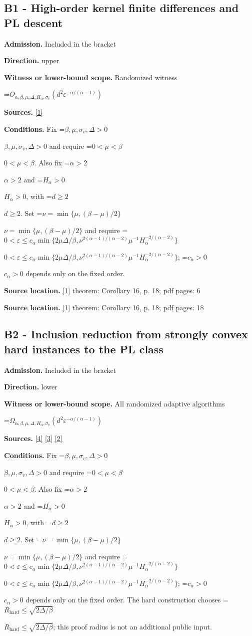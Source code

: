 \documentclass[10pt,a4paper]{article}
\newcommand{\AtlasMath}[1]{\par\begingroup\centering\setbox0=\hbox{$\displaystyle #1$}\ifdim\wd0>1.4\linewidth\typeout{ATLAS WIDE FORMULA: \the\wd0}\fi\ifdim\wd0>\linewidth\resizebox{\linewidth}{!}{\box0}\else\box0\fi\par\endgroup}
\newcommand{\AtlasInlineMath}[1]{\begingroup\setbox0=\hbox{$#1$}\ifdim\wd0>.4\linewidth\endgroup\AtlasMath{#1}\else\endgroup$#1$\fi}
\begin{document}
\subsection{B1 - High-order kernel finite differences and PL descent}
\textbf{Admission.} Included in the bracket

\textbf{Direction.} upper

\textbf{Witness or lower-bound scope.} Randomized witness

\AtlasMath{O_{\alpha,\beta,\mu,\Delta,H_\alpha,\sigma_v}(d^2\varepsilon^{-\alpha/(\alpha-1)})}
\textbf{Sources.} \href{https://jmlr.org/papers/volume25/23-0733/23-0733.pdf}{[1]}

\textbf{Conditions.} Fix \AtlasInlineMath{\beta,\mu,\sigma_v,\Delta>0} and require \AtlasInlineMath{0<\mu<\beta}. Also fix \AtlasInlineMath{\alpha>2} and \AtlasInlineMath{H_\alpha>0}, with \AtlasInlineMath{d\ge2}. Set \AtlasInlineMath{\nu=\min\{\mu,(\beta-\mu)/2\}} and require \AtlasInlineMath{0<\varepsilon\le c_\alpha\min\{2\mu\Delta/\beta,\nu^{2(\alpha-1)/(\alpha-2)}\mu^{-1}H_\alpha^{-2/(\alpha-2)}\}}; \AtlasInlineMath{c_\alpha>0} depends only on the fixed order.

\textbf{Source location.} \href{https://jmlr.org/papers/volume25/23-0733/23-0733.pdf}{[1]} theorem: Corollary 16, p. 18; pdf pages: 6

\textbf{Source location.} \href{https://jmlr.org/papers/volume25/23-0733/23-0733.pdf}{[1]} theorem: Corollary 16, p. 18; pdf pages: 18

\subsection{B2 - Inclusion reduction from strongly convex hard instances to the PL class}
\textbf{Admission.} Included in the bracket

\textbf{Direction.} lower

\textbf{Witness or lower-bound scope.} All randomized adaptive algorithms

\AtlasMath{\Omega_{\alpha,\beta,\mu,\Delta,H_\alpha,\sigma_v}(d^2\varepsilon^{-\alpha/(\alpha-1)})}
\textbf{Sources.} \href{https://proceedings.mlr.press/v30/Shamir13.html}{[4]} \href{https://arxiv.org/pdf/2610.05517v2}{[3]} \href{https://arxiv.org/html/2610.00276v2}{[2]}

\textbf{Conditions.} Fix \AtlasInlineMath{\beta,\mu,\sigma_v,\Delta>0} and require \AtlasInlineMath{0<\mu<\beta}. Also fix \AtlasInlineMath{\alpha>2} and \AtlasInlineMath{H_\alpha>0}, with \AtlasInlineMath{d\ge2}. Set \AtlasInlineMath{\nu=\min\{\mu,(\beta-\mu)/2\}} and require \AtlasInlineMath{0<\varepsilon\le c_\alpha\min\{2\mu\Delta/\beta,\nu^{2(\alpha-1)/(\alpha-2)}\mu^{-1}H_\alpha^{-2/(\alpha-2)}\}}; \AtlasInlineMath{c_\alpha>0} depends only on the fixed order. The hard construction chooses \AtlasInlineMath{R_{\mathrm{hard}}\le\sqrt{2\Delta/\beta}}; this proof radius is not an additional public input.
\end{document}
